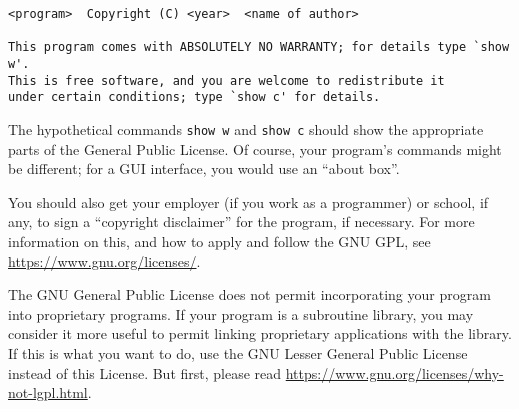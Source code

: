 \documentclass{scrbook}
\begin{document}
\begin{enumerate}
{\footnotesize
\begin{verbatim}
<program>  Copyright (C) <year>  <name of author>

This program comes with ABSOLUTELY NO WARRANTY; for details type `show w'.
This is free software, and you are welcome to redistribute it
under certain conditions; type `show c' for details.
\end{verbatim}
}

The hypothetical commands \texttt{show w} and \texttt{show c} should show
the appropriate parts of the General Public License.  Of course, your program's
commands might be different; for a GUI interface, you would use an
``about box''.

You should also get your employer (if you work as a programmer) or
school, if any, to sign a ``copyright disclaimer'' for the program, if
necessary.  For more information on this, and how to apply and follow
the GNU GPL, see \url{https://www.gnu.org/licenses/}.

The GNU General Public License does not permit incorporating your
program into proprietary programs.  If your program is a subroutine
library, you may consider it more useful to permit linking proprietary
applications with the library.  If this is what you want to do, use
the GNU Lesser General Public License instead of this License.  But
first, please read \url{https://www.gnu.org/licenses/why-not-lgpl.html}.

\end{enumerate}




\backmatter
\printbibliography
\end{document}
